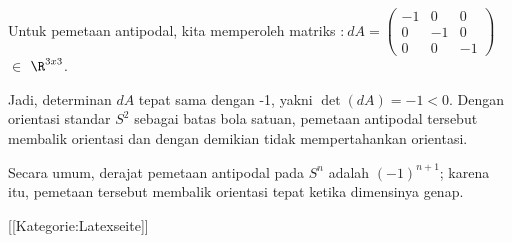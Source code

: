 Untuk pemetaan antipodal, kita memperoleh matriks
:$
\ dA = \begin{pmatrix}
-1 & 0 & 0 \\
0 & -1 & 0 \\
0 & 0 & -1 \end{pmatrix}
$ $ \in $ $\R^{3x3}$.

Jadi, determinan $dA$ tepat sama dengan -1, yakni
 $ \det(dA) = -1 <0$.
Dengan orientasi standar $S^2$ sebagai batas bola satuan, pemetaan antipodal tersebut membalik orientasi dan dengan demikian tidak mempertahankan orientasi.

Secara umum, derajat pemetaan antipodal pada $S^n$ adalah $(-1)^{n+1}$; karena itu, pemetaan tersebut membalik orientasi tepat ketika dimensinya genap.

 [[Kategorie:Latexseite]]
